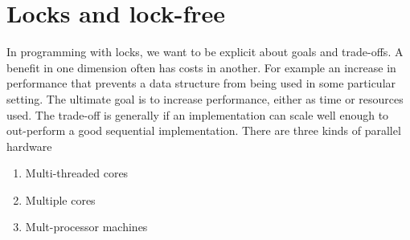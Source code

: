 \documentclass[CS4204-Notes.tex]{subfiles}
\begin{document}
\section{Locks and lock-free}
In programming with locks, we want to be explicit about goals and trade-offs. A benefit in one dimension often has costs in another. For example an increase in performance that prevents a data structure from being used in some particular setting. The ultimate goal is to increase performance, either as time or resources used. The trade-off is generally if an implementation can scale well enough to out-perform a good sequential implementation.
\n
There are three kinds of parallel hardware
\begin{enumerate}
\item Multi-threaded cores
\item Multiple cores
\item Mult-processor machines
\end{enumerate}
\end{document}
